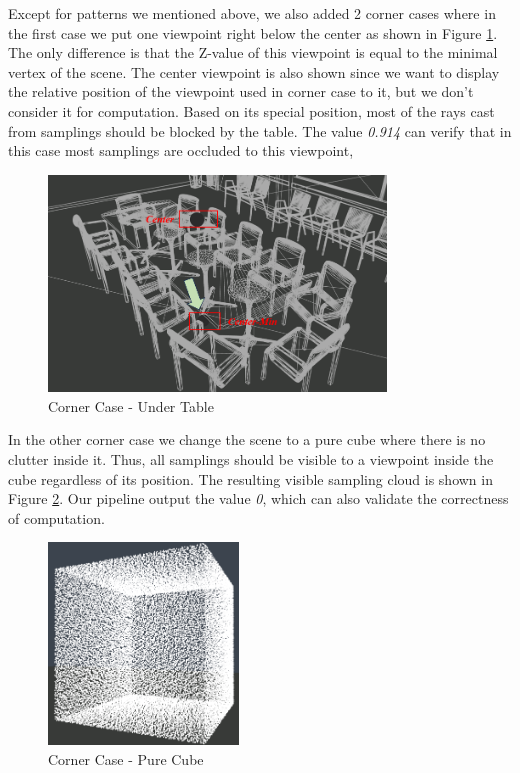\documentclass[11pt, a4paper,oneside,chapterprefix=false]{scrbook}
\begin{document}
\vspace{10pt}

Except for patterns we mentioned above, we also added 2 corner cases where in the first case we put one viewpoint right below the center as shown in Figure \ref{fig:corner case under table}. The only difference is that the Z-value of this viewpoint is equal to the minimal vertex of the scene. The center viewpoint is also shown since we want to display the relative position of the viewpoint used in corner case to it, but we don't consider it for computation. Based on its special position, most of the rays cast from samplings should be blocked by the table. The value \emph{0.914} can verify that in this case most samplings are occluded to this viewpoint, 

\begin{figure}[H]
    \centering
    \includegraphics*[width=0.8\textwidth]{figures/edge case-under table.png}
    \caption{Corner Case - Under Table}
    \label{fig:corner case under table}
\end{figure}

In the other corner case we change the scene to a pure cube where there is no clutter inside it. Thus, all samplings should be visible to a viewpoint inside the cube regardless of its position. The resulting visible sampling cloud is shown in Figure \ref{fig:corner case pure cube}. Our pipeline output the value \emph{0}, which can also validate the correctness of computation. 

\vspace{10pt}

\begin{figure}[H]
    \centering
    \includegraphics*[width=0.45\textwidth]{figures/cube with all samples.png}
    \caption{Corner Case - Pure Cube}
    \label{fig:corner case pure cube}
\end{figure}
\end{document}
